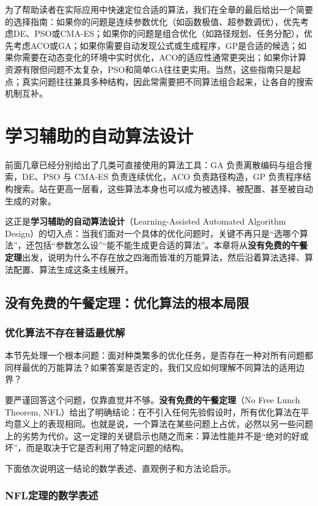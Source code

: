 \documentclass[lang=cn,zihao=-4,a4paper,fontset=windows]{beautybook}
\begin{document}
为了帮助读者在实际应用中快速定位合适的算法，我们在全章的最后给出一个简要的选择指南：如果你的问题是连续参数优化（如函数极值、超参数调优），优先考虑DE、PSO或CMA-ES；如果你的问题是组合优化（如路径规划、任务分配），优先考虑ACO或GA；如果你需要自动发现公式或生成程序，GP是合适的候选；如果你需要在动态变化的环境中实时优化，ACO的适应性通常更突出；如果你计算资源有限但问题不太复杂，PSO和简单GA往往更实用。当然，这些指南只是起点；真实问题往往兼具多种结构，因此常需要把不同算法组合起来，让各自的搜索机制互补。


\chapter{学习辅助的自动算法设计}

前面几章已经分别给出了几类可直接使用的算法工具：GA 负责离散编码与组合搜索，DE、PSO 与 CMA-ES 负责连续优化，ACO 负责路径构造，GP 负责程序结构搜索。站在更高一层看，这些算法本身也可以成为被选择、被配置、甚至被自动生成的对象。

这正是\textbf{学习辅助的自动算法设计}（Learning-Assisted Automated Algorithm Design）的切入点：当我们面对一个具体的优化问题时，关键不再只是“选哪个算法”，还包括“参数怎么设”“能不能生成更合适的算法”。本章将从\textbf{没有免费的午餐定理}出发，说明为什么不存在放之四海而皆准的万能算法，然后沿着算法选择、算法配置、算法生成这条主线展开。

\section{没有免费的午餐定理：优化算法的根本局限}

\subsection{优化算法不存在普适最优解}

本节先处理一个根本问题：面对种类繁多的优化任务，是否存在一种对所有问题都同样最优的万能算法？如果答案是否定的，我们又应如何理解不同算法的适用边界？

要严谨回答这个问题，仅靠直觉并不够。\textbf{没有免费的午餐定理}（No Free Lunch Theorem, NFL）给出了明确结论：在不引入任何先验假设时，所有优化算法在平均意义上的表现相同。也就是说，一个算法在某些问题上占优，必然以另一些问题上的劣势为代价。这一定理的关键启示也随之而来：算法性能并不是“绝对的好或坏”，而是取决于它是否利用了特定问题的结构。

下面依次说明这一结论的数学表述、直观例子和方法论启示。

\subsection{NFL定理的数学表述}
\end{document}
